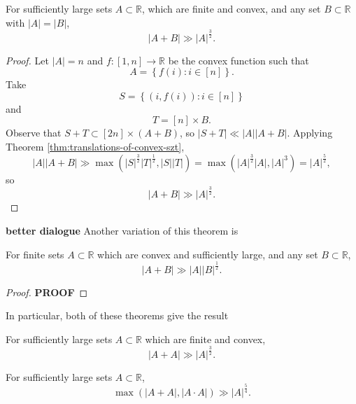 \documentclass[12pt]{amsart}
\begin{document}
\begin{theorem}
For sufficiently large sets \(A \subset \mathbb{R} \), which are finite and convex, and any set \(B \subset \mathbb{R} \) with \(\left\lvert A \right\rvert = \left\lvert B \right\rvert \),
\[
    \left\lvert A + B \right\rvert \gg \left\lvert A \right\rvert ^{\frac{3}{2} }
.\]
\end{theorem}

\begin{proof}
Let \(\left\lvert A \right\rvert = n\) and \(f : [1,n] \to \mathbb{R} \) be the convex function
such that
\[
    A = \left\{ f(i): i \in [n] \right\}
.\]
Take
\[
    S = \left\{ (i,f(i)) : i \in [n] \right\} 
\]
and
\[
    T = [n] \times B
.\]
Observe that \(S + T \subset [2n] \times (A + B)\), so \(\left\lvert S + T \right\rvert \ll \left\lvert A \right\rvert \left\lvert A + B \right\rvert \). Applying Theorem \ref{thm:translations-of-convex-szt},
\[
    \left\lvert A \right\rvert \left\lvert A + B \right\rvert \gg \max \left( \left\lvert S \right\rvert ^{\frac{3}{2} }\left\lvert T \right\rvert ^{\frac{1}{2} } , \left\lvert S \right\rvert \left\lvert T \right\rvert  \right) = \max \left( \left\lvert A \right\rvert ^{\frac{3}{2} }\left\lvert A \right\rvert , \left\lvert A \right\rvert ^{3} \right) = \left\lvert A \right\rvert ^{\frac{5}{2} }
,\]
so
\[
    \left\lvert A + B \right\rvert \gg \left\lvert A \right\rvert ^{\frac{3}{2} }
.\]
\end{proof}

\textbf{better dialogue}
Another variation of this theorem is

\begin{theorem}
For finite sets \(A \subset \mathbb{R} \) which are convex and sufficiently large, and
any set \(B \subset \mathbb{R} \),
\[
    \left\lvert A + B \right\rvert \gg \left\lvert A \right\rvert \left\lvert B \right\rvert ^{\frac{1}{2} }
.\]
\end{theorem}

\begin{proof}
\textbf{PROOF}
\end{proof}

In particular, both of these theorems give the result
\begin{theorem}
For sufficiently large sets \(A \subset \mathbb{R} \) which are finite and convex,
\[
    \left\lvert A+A \right\rvert \gg \left\lvert A \right\rvert ^{\frac{3}{2} }
.\]
\end{theorem}


\begin{theorem}
    For sufficiently large sets \(A \subset \mathbb{R} \),
    \[
        \max \left( \left\lvert A+A \right\rvert, \left\lvert A\cdot A \right\rvert  \right) \gg \left\lvert A \right\rvert ^{\frac{5}{4} }
    .\]
\end{theorem}
\end{document}
